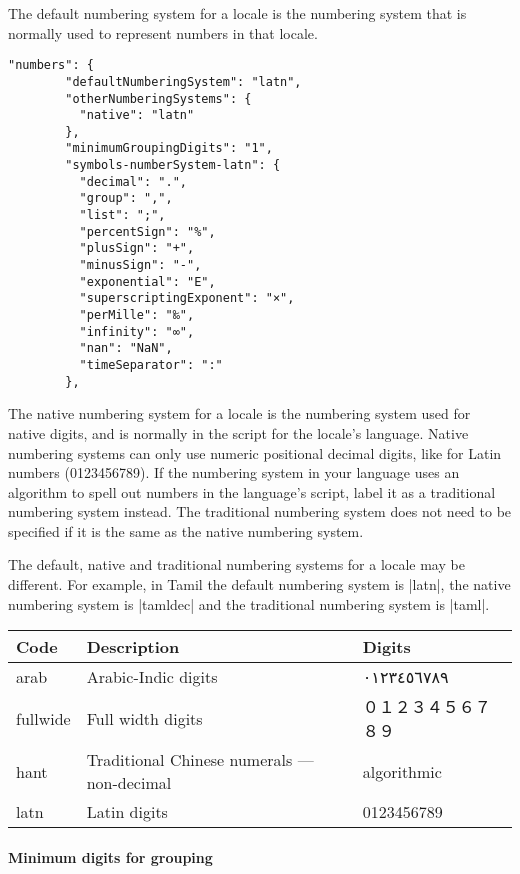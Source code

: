 The default numbering system for a locale is the numbering system that is normally used to represent numbers in that locale.

\begin{verbatim}
"numbers": {
        "defaultNumberingSystem": "latn",
        "otherNumberingSystems": {
          "native": "latn"
        },
        "minimumGroupingDigits": "1",
        "symbols-numberSystem-latn": {
          "decimal": ".",
          "group": ",",
          "list": ";",
          "percentSign": "%",
          "plusSign": "+",
          "minusSign": "-",
          "exponential": "E",
          "superscriptingExponent": "×",
          "perMille": "‰",
          "infinity": "∞",
          "nan": "NaN",
          "timeSeparator": ":"
        },
\end{verbatim}

The native numbering system for a locale is the numbering system used for native digits, and is normally in the script for the locale's language. Native numbering systems can only use numeric positional decimal digits, like for Latin numbers (0123456789). If the numbering system in your language uses an algorithm to spell out numbers in the language's script, label it as a traditional numbering system instead. The traditional numbering system does not need to be specified if it is the same as the native numbering system.

The default, native and traditional numbering systems for a locale may be different. For example, in Tamil the default numbering system is |latn|, the native numbering system is |tamldec| and the traditional numbering system is |taml|.

\begin{trivlist}\item[]
\begin{tabular}{lll}
\toprule
Code	 & Description	 & Digits\\
\midrule
arab	 & Arabic-Indic digits	&\panunicode ٠١٢٣٤٥٦٧٨٩\\
fullwide &   	Full width digits &\panunicode 	０１２３４５６７８９\\
hant	   & Traditional Chinese numerals — non-decimal	& algorithmic\\
latn	   &Latin digits	 &0123456789\\
\bottomrule
\end{tabular}
\end{trivlist}

\paragraph{Minimum digits for grouping}

